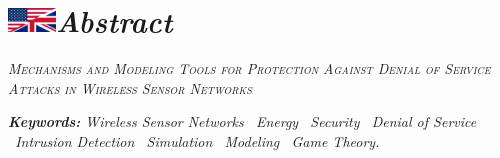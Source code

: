 \chapter[Résumé (anglais)]{\includegraphics[height=18pt]{Front/Figures/US-UK_flag.pdf}\quad\itshape Abstract}

\begin{english}
\begin{center}
    \LARGE\it\scshape\color{chapterLACL}Mechanisms and Modeling Tools for Protection Against Denial of Service Attacks in Wireless Sensor Networks
\end{center}
\vspace{2\baselineskip}

{\itshape

}

\vspace{2\baselineskip}
{\it
\noindent\textbf{Keywords:} Wireless Sensor Networks \textbullet\ Energy \textbullet\ Security \textbullet\ Denial of Service \textbullet\ Intrusion Detection \textbullet\ Simulation \textbullet\ Modeling \textbullet\ Game Theory.
}
\end{english}
